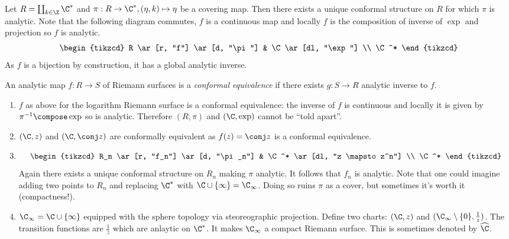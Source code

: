 \documentclass[a4paper]{article}
\begin{document}
\begin{eg}
  Let \(R = \coprod_{k \in \Z} \C^*\) and \(\pi: R \to \C^*, (\eta, k) \mapsto \eta\) be a covering map. Then there exists a unique conformal structure on \(R\) for which \(\pi\) is analytic. Note that the following diagram commutes, \(f\) is a continuous map and locally \(f\) is the composition of inverse of \(\exp\) and projection so \(f\) is analytic.
  \[
    \begin{tikzcd}
      R \ar[r, "f"] \ar[d, "\pi"] & \C \ar[dl, "\exp"] \\
      \C^*
    \end{tikzcd}
  \]
  As \(f\) is a bijection by construction, it has a global analytic inverse.
\end{eg}

\begin{definition}
  An analytic map \(f: R \to S\) of Riemann surfaces is a \emph{conformal equivalence} if there exists \(g: S \to R\) analytic inverse to \(f\).
\end{definition}

\begin{eg}\leavevmode
  \begin{enumerate}
  \item \(f\) as above for the logarithm Riemann surface is a conformal equivalence: the inverse of \(f\) is continuous and locally it is given by \(\pi^{-1} \compose \exp\) so is analytic. Therefore \((R, \pi)\) and \((\C, \exp)\) cannot be ``told apart''.
  \item \((\C, z)\) and \((\C, \conj z)\) are conformally equivalent as \(f(z) = \conj z\) is a conformal equivalence.
  \item
    \[
      \begin{tikzcd}
        R_n \ar[r, "f_n"] \ar[d, "\pi_n"] & \C^* \ar[dl, "z \mapsto z^n"] \\
        \C^*
      \end{tikzcd}
    \]
    Again there exists a unique conformal structure on \(R_n\) making \(\pi\) analytic. It follows that \(f_n\) is analytic. Note that one could imagine adding two points to \(R_n\) and replacing \(\C^*\) with \(\C \cup \{\infty\} = \C_\infty\). Doing so ruins \(\pi\) as a cover, but sometimes it's worth it (compactness!).
  \item \(\C_\infty = \C \cup \{\infty\}\) equipped with the sphere topology via steoreographic projection. Define two charts: \((\C, z)\) and \((\C_\infty \setminus \{0\}, \frac{1}{z})\). The transition functions are \(\frac{1}{z}\) which are anlaytic on \(\C^*\). It makes \(\C_\infty\) a compact Riemann surface. This is sometimes denoted by \(\widehat \C\).
  \end{enumerate}
\end{eg}
\end{document}

